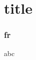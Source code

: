 \documentclass{beamer}
\begin{document}
\section{title}

\begin{frame}
\frametitle{fr}
    abc
\end{frame} 
\end{document}
